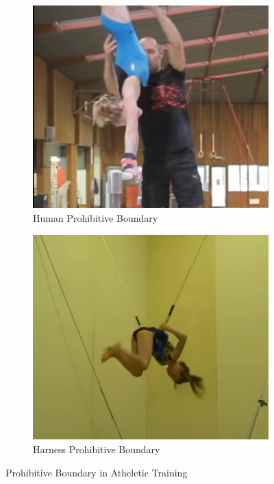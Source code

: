 \documentclass[journal]{IEEEtran}
\begin{document}
\begin{figure}[H]
\centering
\begin{subfigure}{0.25\textwidth}
  \centering
  \includegraphics[width=\linewidth]{training1.png}
  \caption{Human Prohibitive Boundary}
\end{subfigure}%
\begin{subfigure}{.25\textwidth}
  \centering
  \includegraphics[width=\linewidth]{training2.png}
  \caption{Harness Prohibitive Boundary}
\end{subfigure}
\caption{Prohibitive Boundary in Atheletic Training}
\label{fig:athelet}
\end{figure}
\end{document}

